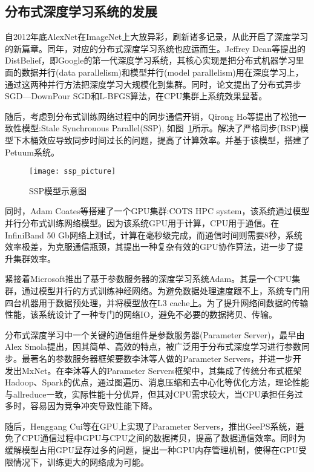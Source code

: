 \subsection{分布式深度学习系统的发展}
自2012年底AlexNet在ImageNet上大放异彩，刷新诸多记录，从此开启了深度学习的新篇章。同年，对应的分布式深度学习系统也应运而生。Jeffrey Dean等提出的DistBelief，即Google的第一代深度学习系统，其核心实现是把分布式机器学习里面的数据并行(data parallelism)和模型并行(model parallelism)用在深度学习上，通过这两种并行方法把深度学习大规模化到集群。同时，论文提出了分布式异步SGD—DownPour SGD和L-BFGS算法，在CPU集群上系统效果显著。

随后，考虑到分布式训练网络过程中的同步通信开销，Qirong Ho等提出了松弛一致性模型:Stale Synchronous Parallel(SSP), 如图~\ref{fig:ssp_picture}所示。解决了严格同步(BSP)模型下木桶效应导致同步时间过长的问题，提高了计算效率。并基于该模型，搭建了Petuum系统。

\begin{figure}[htp]
\centering
\texttt{[image: ssp\_picture]}
\caption{SSP模型示意图}
\label{fig:ssp_picture}
\end{figure}
同时，Adam Coates等搭建了一个GPU集群:COTS HPC system，该系统通过模型并行分布式训练网络模型。因为该系统GPU用于计算，CPU用于通信。在InfiniBand 50 Gb网络上测试，计算在毫秒级完成，而通信时间则需要8秒，系统效率极差，为克服通信瓶颈，其提出一种复杂有效的GPU协作算法，进一步了提升集群效率。

紧接着Microsoft推出了基于参数服务器的深度学习系统Adam。其是一个CPU集群，通过模型并行的方式训练神经网络。为避免数据处理速度跟不上，系统专门用四台机器用于数据预处理，并将模型放在L3 cache上。为了提升网络间数据的传输性能，该系统设计了一种专门的网络IO，避免不必要的数据拷贝、传输。

分布式深度学习中一个关键的通信组件是参数服务器(Parameter Server)，最早由Alex Smola提出，因其简单、高效的特点，被广泛用于分布式深度学习进行参数同步。最著名的参数服务器框架要数李沐等人做的Parameter Servers，并进一步开发出MxNet。在李沐等人的Parameter Servers框架中，其集成了传统分布式框架Hadoop、Spark的优点，通过图遍历、消息压缩和去中心化等优化方法，理论性能与allreduce一致，实际性能十分优异，但其对CPU需求较大，当CPU承担任务过多时，容易因为竞争冲突导致性能下降。

随后，Henggang Cui等在GPU上实现了Parameter Servers，推出GeePS系统，避免了CPU通信过程中GPU与CPU之间的数据拷贝，提高了数据通信效率。同时为缓解模型占用GPU显存过多的问题，提出一种GPU内存管理机制，使得在GPU受限情况下，训练更大的网络成为可能。
